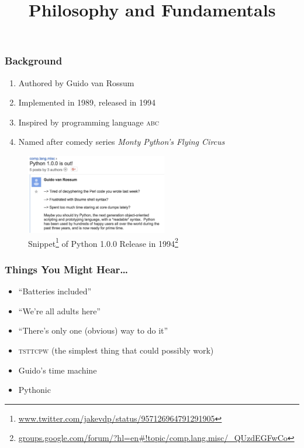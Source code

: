 \documentclass{beamer}
\title[Intro to Python]{Philosophy and Fundamentals}
\begin{document}
  \frame{\titlepage}

  \begin{frame}
    \frametitle{Background}
    \begin{enumerate}
      \item Authored by Guido van Rossum
      \item Implemented in 1989, released in 1994
      \item Inspired by programming language \textsc{abc}
      \item Named after comedy series \textit{Monty Python's Flying Circus}
    \end{enumerate}
    \begin{figure}
      \begin{center}
      \includegraphics[width=175pt,keepaspectratio]{release.jpg}
      \caption
      {
        Snippet\footnote{\url{www.twitter.com/jakevdp/status/957126964791291905}}
        of Python 1.0.0 Release in 
        1994\footnote
        {
         \url{groups.google.com/forum/?hl=en\#!topic/comp.lang.misc/_QUzdEGFwCo}
        }
      }
      \end{center}
    \end{figure}
  \end{frame}

  \begin{frame}
    \frametitle{Things You Might Hear\ldots}
    \begin{itemize}
      \item ``Batteries included''
      \item ``We're all adults here''
      \item ``There's only one (obvious) way to do it''
      \item \textsc{tsttcpw} (the simplest thing that could possibly work)
      \item Guido's time machine
      \item Pythonic
    \end{itemize}
  \end{frame}
\end{document}
